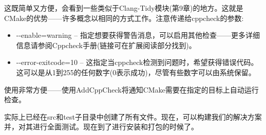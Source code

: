 这既简单又方便，会看到一些类似于Clang-Tidy模块(第9章)的地方。这就是CMake的优势——许多概念以相同的方式工作。注意传递给cppcheck的参数:

\begin{itemize}
\item 
-{}-enable=warning – 指定想要获得警告消息，可以启用其他检查——更多详细信息请参阅Cppcheck手册(链接可在扩展阅读部分找到)。

\item 
-{}-error-exitcode=10 – 这指定当cppcheck检测到问题时，希望获得错误代码。这可以是从1到255的任何数字(0表示成功)，尽管有些数字可以由系统保留。
\end{itemize}

使用非常方便——使用AddCppCheck将通知CMake需要在指定的目标上自动运行检查。

实际上已经在src和test子目录中创建了所有文件。现在，可以构建我们的解决方案并，对其进行全面测试。现在到了进行安装和打包的时候了。


























